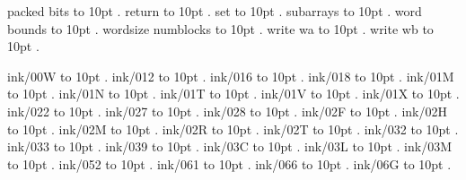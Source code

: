 \smallskip
packed bits \leaders\hbox to 10pt {\hss.\hss}  \hfill {}
\smallskip
return \leaders\hbox to 10pt {\hss.\hss}  \hfill {}
\smallskip
set \leaders\hbox to 10pt {\hss.\hss}  \hfill {}
\smallskip
subarrays \leaders\hbox to 10pt {\hss.\hss}  \hfill {}
\smallskip
word bounds \leaders\hbox to 10pt {\hss.\hss}  \hfill {}
\smallskip
wordsize numblocks \leaders\hbox to 10pt {\hss.\hss}  \hfill {}
\smallskip
write wa \leaders\hbox to 10pt {\hss.\hss}  \hfill {}
\smallskip
write wb \leaders\hbox to 10pt {\hss.\hss}  \hfill {}
\smallskip
\par\endgroup
\bigskip
ink/00W \leaders\hbox to 10pt {\hss.\hss}  \hfill {}
\smallskip
ink/012 \leaders\hbox to 10pt {\hss.\hss}  \hfill {}
\smallskip
ink/016 \leaders\hbox to 10pt {\hss.\hss}  \hfill {}
\smallskip
ink/018 \leaders\hbox to 10pt {\hss.\hss}  \hfill {}
\smallskip
ink/01M \leaders\hbox to 10pt {\hss.\hss}  \hfill {}
\smallskip
ink/01N \leaders\hbox to 10pt {\hss.\hss}  \hfill {}
\smallskip
ink/01T \leaders\hbox to 10pt {\hss.\hss}  \hfill {}
\smallskip
ink/01V \leaders\hbox to 10pt {\hss.\hss}  \hfill {}
\smallskip
ink/01X \leaders\hbox to 10pt {\hss.\hss}  \hfill {}
\smallskip
ink/022 \leaders\hbox to 10pt {\hss.\hss}  \hfill {}
\smallskip
ink/027 \leaders\hbox to 10pt {\hss.\hss}  \hfill {}
\smallskip
ink/028 \leaders\hbox to 10pt {\hss.\hss}  \hfill {}
\smallskip
ink/02F \leaders\hbox to 10pt {\hss.\hss}  \hfill {}
\smallskip
ink/02H \leaders\hbox to 10pt {\hss.\hss}  \hfill {}
\smallskip
ink/02M \leaders\hbox to 10pt {\hss.\hss}  \hfill {}
\smallskip
ink/02R \leaders\hbox to 10pt {\hss.\hss}  \hfill {}
\smallskip
ink/02T \leaders\hbox to 10pt {\hss.\hss}  \hfill {}
\smallskip
ink/032 \leaders\hbox to 10pt {\hss.\hss}  \hfill {}
\smallskip
ink/033 \leaders\hbox to 10pt {\hss.\hss}  \hfill {}
\smallskip
ink/039 \leaders\hbox to 10pt {\hss.\hss}  \hfill {}
\smallskip
ink/03C \leaders\hbox to 10pt {\hss.\hss}  \hfill {}
\smallskip
ink/03L \leaders\hbox to 10pt {\hss.\hss}  \hfill {}
\smallskip
ink/03M \leaders\hbox to 10pt {\hss.\hss}  \hfill {}
\smallskip
ink/052 \leaders\hbox to 10pt {\hss.\hss}  \hfill {}
\smallskip
ink/061 \leaders\hbox to 10pt {\hss.\hss}  \hfill {}
\smallskip
ink/066 \leaders\hbox to 10pt {\hss.\hss}  \hfill {}
\smallskip
ink/06G \leaders\hbox to 10pt {\hss.\hss}  \hfill {}
\smallskip
